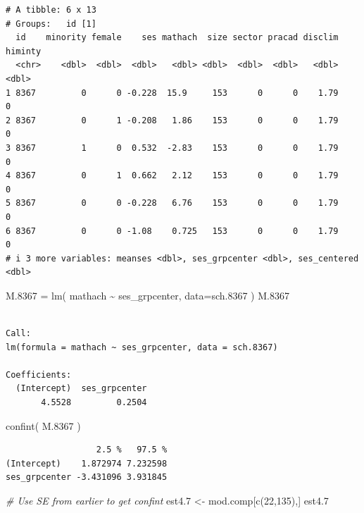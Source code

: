 \documentclass[
  letterpaper,
  DIV=11,
  numbers=noendperiod]{scrreprt}
\newenvironment{Shaded}{}{}
\newcommand{\AttributeTok}[1]{\textcolor[rgb]{0.49,0.56,0.16}{#1}}
\newcommand{\CommentTok}[1]{\textcolor[rgb]{0.38,0.63,0.69}{\textit{#1}}}
\newcommand{\DecValTok}[1]{\textcolor[rgb]{0.25,0.63,0.44}{#1}}
\newcommand{\FloatTok}[1]{\textcolor[rgb]{0.25,0.63,0.44}{#1}}
\newcommand{\FunctionTok}[1]{\textcolor[rgb]{0.02,0.16,0.49}{#1}}
\newcommand{\NormalTok}[1]{#1}
\newcommand{\OtherTok}[1]{\textcolor[rgb]{0.00,0.44,0.13}{#1}}
\newcommand{\SpecialCharTok}[1]{\textcolor[rgb]{0.25,0.44,0.63}{#1}}
\begin{document}
\begin{verbatim}
# A tibble: 6 x 13
# Groups:   id [1]
  id    minority female    ses mathach  size sector pracad disclim himinty
  <chr>    <dbl>  <dbl>  <dbl>   <dbl> <dbl>  <dbl>  <dbl>   <dbl>   <dbl>
1 8367         0      0 -0.228  15.9     153      0      0    1.79       0
2 8367         0      1 -0.208   1.86    153      0      0    1.79       0
3 8367         1      0  0.532  -2.83    153      0      0    1.79       0
4 8367         0      1  0.662   2.12    153      0      0    1.79       0
5 8367         0      0 -0.228   6.76    153      0      0    1.79       0
6 8367         0      0 -1.08    0.725   153      0      0    1.79       0
# i 3 more variables: meanses <dbl>, ses_grpcenter <dbl>, ses_centered <dbl>
\end{verbatim}

\begin{Shaded}
\begin{Highlighting}[]
\NormalTok{M}\FloatTok{.8367} \OtherTok{=} \FunctionTok{lm}\NormalTok{( mathach }\SpecialCharTok{\textasciitilde{}}\NormalTok{ ses\_grpcenter, }\AttributeTok{data=}\NormalTok{sch}\FloatTok{.8367}\NormalTok{ )}
\NormalTok{M}\FloatTok{.8367}
\end{Highlighting}
\end{Shaded}

\begin{verbatim}

Call:
lm(formula = mathach ~ ses_grpcenter, data = sch.8367)

Coefficients:
  (Intercept)  ses_grpcenter  
       4.5528         0.2504  
\end{verbatim}

\begin{Shaded}
\begin{Highlighting}[]
\FunctionTok{confint}\NormalTok{( M}\FloatTok{.8367}\NormalTok{ )}
\end{Highlighting}
\end{Shaded}

\begin{verbatim}
                  2.5 %   97.5 %
(Intercept)    1.872974 7.232598
ses_grpcenter -3.431096 3.931845
\end{verbatim}

\begin{Shaded}
\begin{Highlighting}[]
\CommentTok{\# Use SE from earlier to get confint}
\NormalTok{est4}\FloatTok{.7} \OtherTok{\textless{}{-}}\NormalTok{ mod.comp[}\FunctionTok{c}\NormalTok{(}\DecValTok{22}\NormalTok{,}\DecValTok{135}\NormalTok{),]}
\NormalTok{est4}\FloatTok{.7}
\end{Highlighting}
\end{Shaded}
\end{document}
